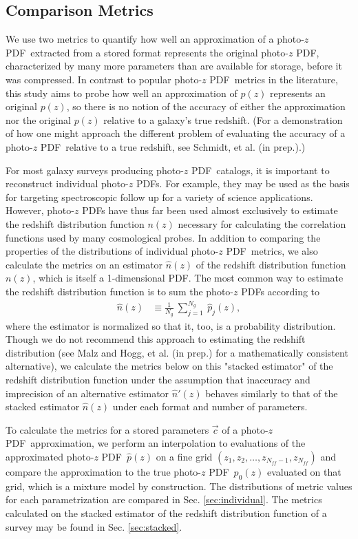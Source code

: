 \documentclass[\docopts]{\docclass}
\newcommand{\pz}{photo-$z$ PDF}
\begin{document}
\subsection{Comparison Metrics}
\label{sec:metrics}

We use two metrics to quantify how well an approximation of a \pz\ extracted 
from a stored format represents the original \pz, characterized by many more 
parameters than are available for storage, before it was compressed.  In 
contrast to popular \pz\ metrics in the literature, this study aims to probe 
how well an approximation of $p(z)$ represents an original $p(z)$, so there is 
no notion of the accuracy of either the approximation nor the original $p(z)$ 
relative to a galaxy's true redshift.  (For a demonstration of how one might 
approach the different problem of evaluating the accuracy of a \pz\ relative to 
a true redshift, see Schmidt, et al. (in prep.).)

For most galaxy surveys producing \pz\ catalogs, it is important to reconstruct 
individual \pz s.  For example, they may be used as the basis for targeting 
spectroscopic follow up for a variety of science applications.  However, \pz s 
have thus far been used almost exclusively to estimate the redshift 
distribution function $n(z)$ necessary for calculating the correlation 
functions used by many cosmological probes.  In addition to comparing the 
properties of the distributions of individual \pz\ metrics, we also calculate 
the metrics on an estimator $\hat{n}(z)$ of the redshift distribution function 
$n(z)$, which is itself a 1-dimensional PDF.  The most common way to estimate 
the redshift distribution function is to sum the \pz s according to
\begin{align}
  \label{eq:nz}
  \hat{n}(z) &\equiv \frac{1}{N_{g}}\ \sum_{j=1}^{N_{g}}\ \hat{p}_{j}(z),
\end{align}
where the estimator is normalized so that it, too, is a probability 
distribution.  Though we do not recommend this approach to estimating the 
redshift distribution (see Malz and Hogg, et al. (in prep.) for a 
mathematically consistent alternative), we calculate the metrics below on this 
"stacked estimator" of the redshift distribution function under the assumption 
that inaccuracy and imprecision of an alternative estimator $\hat{n}'(z)$ 
behaves similarly to that of the stacked estimator $\hat{n}(z)$ under each 
format and number of parameters.

To calculate the metrics for a stored parameters $\vec{c}$ of a \pz\ 
approximation, we perform an interpolation to evaluations of the approximated 
\pz\ $\hat{p}(z)$ on a fine grid $(z_{1}, z_{2}, \dots, z_{N_{ff}-1}, 
z_{N_{ff}})$ and compare the approximation to the true \pz\ $p_{0}(z)$ 
evaluated on that grid, which is a mixture model by construction.  The 
distributions of metric values for each parametrization are compared in Sec. 
\ref{sec:individual}.  The metrics calculated on the stacked estimator of the 
redshift distribution function of a survey may be found in Sec. 
\ref{sec:stacked}.
\end{document}
